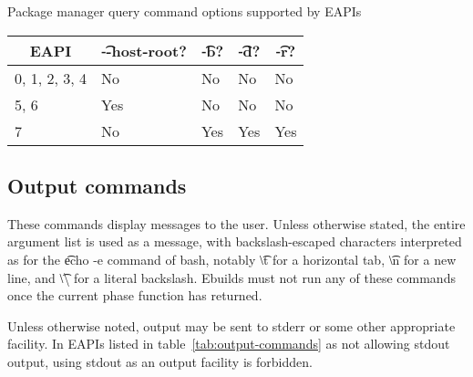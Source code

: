 \begin{centertable}{Package manager query command options supported by EAPIs}
    \label{tab:pm-query-options}
    \begin{tabular}{lllll}
      \toprule
      \multicolumn{1}{c}{\textbf{EAPI}} &
      \multicolumn{1}{c}{\textbf{\t{-{}-host-root}?}} &
      \multicolumn{1}{c}{\textbf{\t{-b}?}} &
      \multicolumn{1}{c}{\textbf{\t{-d}?}} &
      \multicolumn{1}{c}{\textbf{\t{-r}?}} \\
      \midrule
      0, 1, 2, 3, 4     & No  & No  & No  & No  \\
      5, 6              & Yes & No  & No  & No  \\
      7                 & No  & Yes & Yes & Yes \\
      \bottomrule
    \end{tabular}
\end{centertable}

\subsection{Output commands}
These commands display messages to the user. Unless otherwise stated, the entire argument list is
used as a message, with backslash-escaped characters interpreted as for the \t{echo -e} command of
bash, notably \t{\textbackslash t} for a horizontal tab, \t{\textbackslash n} for a new line, and
\t{\textbackslash\textbackslash} for a literal backslash. Ebuilds must not run any of these commands
once the current phase function has returned.

 Unless otherwise noted, output may be sent to stderr or some other
appropriate facility. In EAPIs listed in table~\ref{tab:output-commands} as not allowing stdout
output, using stdout as an output facility is forbidden.

